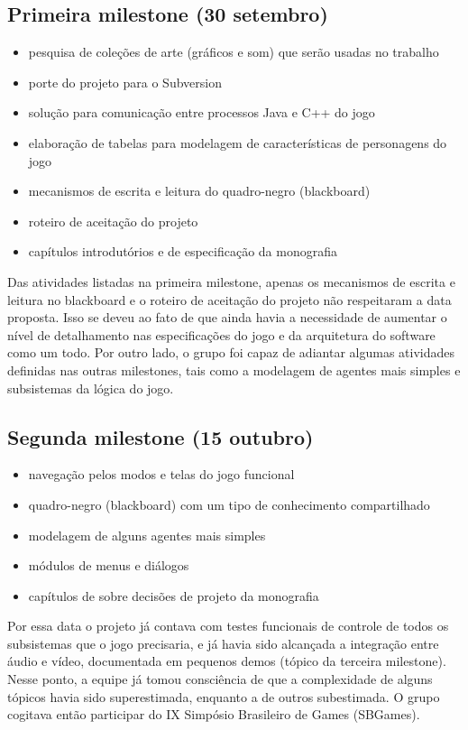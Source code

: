 \subsection{Primeira milestone (30 setembro)}
\begin{itemize}
\item pesquisa de coleções de arte (gráficos e som) que serão usadas no trabalho
\item porte do projeto para o Subversion
\item solução para comunicação entre processos Java e C++ do jogo
\item elaboração de tabelas para modelagem de características de personagens do jogo
\item mecanismos de escrita e leitura do quadro-negro (blackboard)
\item roteiro de aceitação do projeto
\item capítulos introdutórios e de especificação da monografia
\end{itemize}

Das atividades listadas na primeira milestone, apenas os mecanismos de escrita e leitura no blackboard e o roteiro de aceitação do projeto não respeitaram a data proposta. Isso se deveu ao fato de que ainda havia a necessidade de aumentar o nível de detalhamento  nas especificações do jogo e da arquitetura do software como um todo. Por outro lado, o grupo foi capaz de adiantar algumas atividades definidas nas outras milestones, tais como a modelagem de agentes mais simples e subsistemas da lógica do jogo.

\subsection{Segunda milestone (15 outubro)}
\begin{itemize}
\item navegação pelos modos e telas do jogo funcional
\item quadro-negro (blackboard) com um tipo de conhecimento compartilhado
\item modelagem de alguns agentes mais simples
\item módulos de menus e diálogos
\item capítulos de sobre decisões de projeto da monografia
\end{itemize}

Por essa data o projeto já contava com testes funcionais de controle de todos os subsistemas que o jogo precisaria, e já havia sido alcançada a integração entre áudio e vídeo, documentada em pequenos demos (tópico da terceira milestone). Nesse ponto, a equipe já tomou consciência de que a complexidade de alguns tópicos havia sido superestimada, enquanto a de outros subestimada. O grupo cogitava então participar do IX Simpósio Brasileiro de Games (SBGames).

